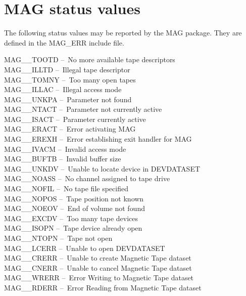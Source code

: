 \documentclass[11pt]{starlink}
\providecommand{\dash}{--}
\begin{document}
\newpage
\section{\label{mag_errors}MAG status values}

The following status values may be reported by the MAG package. They are
defined in the MAG\_ERR include file.

MAG\_\_TOOTD  \dash\ No more available tape descriptors \\
MAG\_\_ILLTD  \dash\ Illegal tape descriptor \\
MAG\_\_TOMNY  \dash\ Too many open tapes \\
MAG\_\_ILLAC  \dash\ Illegal access mode \\
MAG\_\_UNKPA  \dash\ Parameter not found \\
MAG\_\_NTACT  \dash\ Parameter not currently active \\
MAG\_\_ISACT  \dash\ Parameter currently active \\
MAG\_\_ERACT  \dash\ Error activating MAG \\
MAG\_\_EREXH  \dash\ Error establishing exit handler for MAG \\
MAG\_\_IVACM  \dash\ Invalid access mode \\
MAG\_\_BUFTB  \dash\ Invalid buffer size \\
MAG\_\_UNKDV  \dash\ Unable to locate device in DEVDATASET \\
MAG\_\_NOASS  \dash\ No channel assigned to tape drive \\
MAG\_\_NOFIL  \dash\ No tape file specified \\
MAG\_\_NOPOS  \dash\ Tape position not known \\
MAG\_\_NOEOV  \dash\ End of volume not found \\
MAG\_\_EXCDV  \dash\ Too many tape devices \\
MAG\_\_ISOPN  \dash\ Tape device already open \\
MAG\_\_NTOPN  \dash\ Tape not open \\
MAG\_\_LCERR  \dash\ Unable to open DEVDATASET \\
MAG\_\_CRERR  \dash\ Unable to create Magnetic Tape dataset \\
MAG\_\_CNERR  \dash\ Unable to cancel Magnetic Tape dataset \\
MAG\_\_WRERR  \dash\ Error Writing to Magnetic Tape dataset \\
MAG\_\_RDERR  \dash\ Error Reading from Magnetic Tape dataset \\
\end{document}
